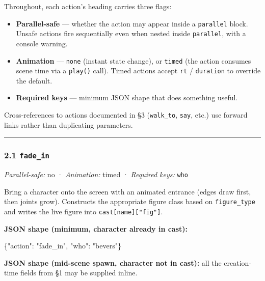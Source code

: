 \documentclass[
  12pt,
  letterpaper,
]{book}
\newenvironment{Shaded}{}{}
\newcommand{\DataTypeTok}[1]{\textcolor[rgb]{0.56,0.13,0.00}{#1}}
\newcommand{\FunctionTok}[1]{\textcolor[rgb]{0.02,0.16,0.49}{#1}}
\newcommand{\StringTok}[1]{\textcolor[rgb]{0.25,0.44,0.63}{#1}}
\providecommand{\tightlist}{%
  \setlength{\itemsep}{0pt}\setlength{\parskip}{0pt}}
\begin{document}
Throughout, each action's heading carries three flags:

\begin{itemize}
\tightlist
\item
  \textbf{Parallel-safe} --- whether the action may appear inside a
  \texttt{parallel} block. Unsafe actions fire sequentially even when
  nested inside \texttt{parallel}, with a console warning.
\item
  \textbf{Animation} --- \texttt{none} (instant state change), or
  \texttt{timed} (the action consumes scene time via a \texttt{play()}
  call). Timed actions accept \texttt{rt} / \texttt{duration} to
  override the default.
\item
  \textbf{Required keys} --- minimum JSON shape that does something
  useful.
\end{itemize}

Cross-references to actions documented in §3 (\texttt{walk\_to},
\texttt{say}, etc.) use forward links rather than duplicating
parameters.

\begin{center}\rule{0.5\linewidth}{0.5pt}\end{center}

\subsubsection{\texorpdfstring{2.1
\texttt{fade\_in}}{2.1 fade\_in}}\label{fade_in}

\emph{Parallel-safe:} no · \emph{Animation:} timed · \emph{Required
keys:} \texttt{who}

Bring a character onto the screen with an animated entrance (edges draw
first, then joints grow). Constructs the appropriate figure class based
on \texttt{figure\_type} and writes the live figure into
\texttt{cast{[}name{]}{[}"fig"{]}}.

\textbf{JSON shape (minimum, character already in cast):}

\begin{Shaded}
\begin{Highlighting}[]
\FunctionTok{\{}\DataTypeTok{"action"}\FunctionTok{:} \StringTok{"fade\_in"}\FunctionTok{,} \DataTypeTok{"who"}\FunctionTok{:} \StringTok{"bevers"}\FunctionTok{\}}
\end{Highlighting}
\end{Shaded}

\textbf{JSON shape (mid-scene spawn, character not in cast):} all the
creation-time fields from §1 may be supplied inline.
\end{document}
